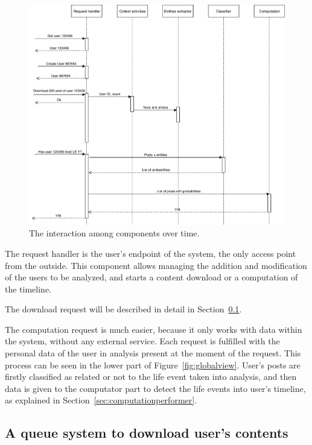 \begin{figure}
\centering
\includegraphics[width=%
1\textwidth]{img/Interaction}
\caption{The interaction among components over time.}
\label{fig:interaction}
\end{figure}

The request handler is the user's endpoint of the system, the only access point from the outside. This component allows managing the addition and modification of the users to be analyzed, and starts a content download or a computation of the timeline.

The download request will be described in detail in Section~\ref{sec:downloadqueues}.

The computation request is much easier, because it only works with data within the system, without any external service. Each request is fulfilled with the personal data of the user in analysis present at the moment of the request. This process can be seen in the lower part of Figure~\ref{fig:globalview}. User's posts are firstly classified as related or not to the life event taken into analysis, and then data is given to the computator part to detect the life events into user's timeline, as explained in Section~\ref{sec:computationperformer}. 

\subsection{A queue system to download user's contents}
\label{sec:downloadqueues}


